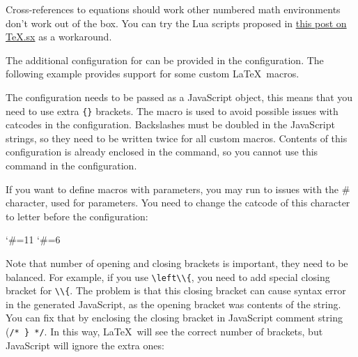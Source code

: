 

Cross-references to equations should work other numbered math environments
don't work out of the box. You can try the Lua scripts proposed in 
\href{https://tex.stackexchange.com/a/597913/2891}{this post on TeX.sx} as
a workaround.

The additional configuration for  can be provided in the
 configuration.
The following example provides support for some custom \LaTeX\ macros.

\begin{texsource}

\EndPreamble

\end{texsource}


The configuration needs to be passed as a JavaScript object, this means that
you need to use extra \verb|{}| brackets.
The \texcommand{\detokenize} macro is used to avoid possible issues with catcodes
in the configuration. Backslashes must be doubled in the
JavaScript strings, so they need to be written twice for all custom macros.
Contents of this configuration is already enclosed in the
\texcommand{\HCode} command, so you cannot use this command in the configuration.

If you want to define macros with parameters, you may run to issues with the \# character, used for parameters.
You need to change the catcode of this character to letter before the  configuration:

\begin{texsource}
\catcode`\#=11
\catcode`\#=6

\EndPreamble
\end{texsource}

Note that number of opening and closing brackets is important, they need to be balanced. 
For example, if you use \verb|\left\\{|, you need to add special closing bracket for \verb|\\{|. 
The problem is that this closing bracket can cause syntax error in the generated JavaScript, 
as the opening bracket was contents of the string. You can fix that by enclosing the closing bracket
in JavaScript comment string (\verb|/* } */|. In this way, \LaTeX\ will see the correct number of brackets,
but JavaScript will ignore the extra ones:

